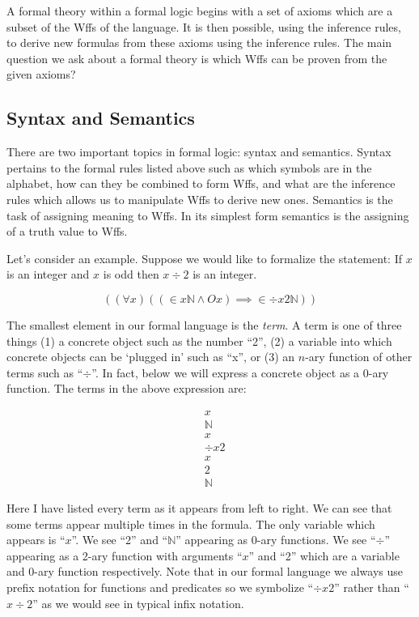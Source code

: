 \documentclass[12pt]{article}
\theoremstyle{break}
\theoremstyle{break}
\theoremstyle{break}
\theoremstyle{break}
\newcommand{\qq}[1]{``#1''}
\begin{document}
A formal theory within a formal logic begins with a set of axioms which are a subset of the Wffs of the language. 
It is then possible, using the inference rules, to derive new formulas from these axioms using the inference rules.
The main question we ask about a formal theory is which Wffs can be proven from the given axioms?

\subsection{Syntax and Semantics}
There are two important topics in formal logic: syntax and semantics.
Syntax pertains to the formal rules listed above such as which symbols are in the alphabet, how can they be combined to form Wffs, and what are the inference rules which allows us to manipulate Wffs to derive new ones.
Semantics is the task of assigning meaning to Wffs.
In its simplest form semantics is the assigning of a truth value to Wffs.

Let's consider an example.
Suppose we would like to formalize the statement: If $x$ is an integer and $x$ is odd then $x \div 2$ is an integer.

$$
((\forall x)((\in x \mathbb{N} \land Ox)\implies \in \div x 2 \mathbb{N}))
$$

The smallest element in our formal language is the \textit{term}.
A term is one of three things (1) a concrete object such as the number \qq{2}, (2) a variable into which concrete objects can be `plugged in' such as \qq{x}, or (3) an $n$-ary function of other terms such as \qq{$\div$}.
In fact, below we will express a concrete object as a 0-ary function.
The terms in the above expression are:

\begin{align}
& x \\
& \mathbb{N} \\
& x \\
& \div x 2 \\
& x \\
& 2 \\
& \mathbb{N}
\end{align}

Here I have listed every term as it appears from left to right.
We can see that some terms appear multiple times in the formula.
The only variable which appears is \qq{$x$}.
We see \qq{2} and \qq{$\mathbb{N}$} appearing as 0-ary functions.
We see \qq{$\div$} appearing as a 2-ary function with arguments \qq{$x$} and \qq{2} which are a variable and 0-ary function respectively.
Note that in our formal language we always use prefix notation for functions and predicates so we symbolize \qq{$\div x2$} rather than \qq{$x \div 2$} as we would see in typical infix notation.
\end{document}
